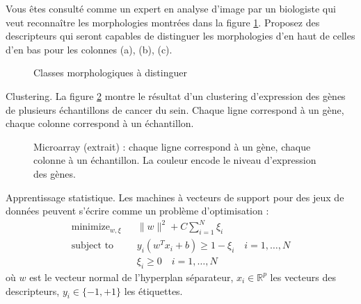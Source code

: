 \documentclass[11pt,addpoints]{exam}
\begin{document}
\begin{questions}
\question[2] Vous êtes consulté comme un expert en analyse d'image par
un biologiste qui veut reconnaître les morphologies montrées dans la
figure \ref{fig:morphologies}. Proposez des descripteurs qui seront
capables de distinguer les
morphologies d'en haut de celles d'en bas pour les colonnes (a), (b),
(c). 
\begin{figure}[h!]
\centering
\caption{Classes morphologiques à distinguer}
\label{fig:morphologies}
\end{figure}

\question[2] Clustering. La figure \ref{fig:micro_array} montre le
résultat d'un clustering d'expression des gènes de plusieurs échantillons de
cancer du sein. Chaque ligne correspond à un gène, chaque colonne
correspond à un échantillon.  
\begin{figure}[h!]
\centering
\caption{Microarray (extrait) : chaque ligne correspond à un gène,
  chaque colonne à un échantillon. La couleur encode le niveau
  d'expression des gènes.}
\label{fig:micro_array}
\end{figure}


\question[2] Apprentissage statistique.
Les machines à vecteurs de support pour des jeux de données
peuvent s'écrire comme un problème d'optimisation : 
\begin{eqnarray*}\label{equ:svm}
\mbox{minimize}_{w,\xi} & & \|w\|^2 + C \sum_{i=1}^{N}\xi_i\\
\mbox{subject to} & & y_i(w^Tx_i + b) \geq 1 - \xi_i \quad i = 1, \ldots, N \\
& & \xi_i \geq 0 \quad i = 1, \ldots, N
\end{eqnarray*}
où $w$ est le vecteur normal de l'hyperplan séparateur, $x_i \in
\mathbb{R}^p$ les vecteurs des descripteurs, $y_i \in \{-1, +1\}$ les
étiquettes. 


\end{questions}
\end{document}
